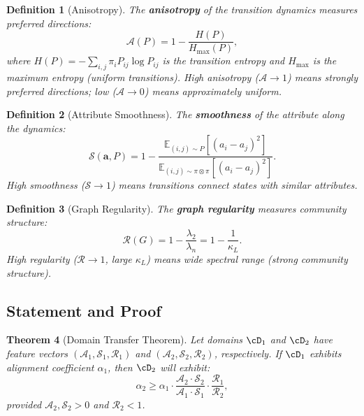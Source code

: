 \documentclass[12pt,letterpaper]{article}
\newtheorem{theorem}{Theorem}[section]
\newtheorem{definition}[theorem]{Definition}
\newcommand{\E}{\mathbb{E}}
\newcommand{\bfa}{\mathbf{a}}
\newcommand{\cA}{\mathcal{A}}
\newcommand{\cS}{\mathcal{S}}
\newcommand{\cR}{\mathcal{R}}
\begin{document}
\begin{definition}[Anisotropy]
\label{def:anisotropy}
The \textbf{anisotropy} of the transition dynamics measures preferred directions:
\[
  \cA(P) = 1 - \frac{H(P)}{H_{\max}(P)},
\]
where $H(P) = -\sum_{i,j} \pi_i P_{ij} \log P_{ij}$ is the transition entropy and $H_{\max}$ is the maximum entropy (uniform transitions). High anisotropy ($\cA \to 1$) means strongly preferred directions; low ($\cA \to 0$) means approximately uniform.
\end{definition}

\begin{definition}[Attribute Smoothness]
\label{def:smoothness}
The \textbf{smoothness} of the attribute along the dynamics:
\[
  \cS(\bfa, P) = 1 - \frac{\E_{(i,j) \sim P}[(a_i - a_j)^2]}{\E_{(i,j) \sim \pi \otimes \pi}[(a_i - a_j)^2]}.
\]
High smoothness ($\cS \to 1$) means transitions connect states with similar attributes.
\end{definition}

\begin{definition}[Graph Regularity]
\label{def:regularity}
The \textbf{graph regularity} measures community structure:
\[
  \cR(G) = 1 - \frac{\lambda_2}{\lambda_n} = 1 - \frac{1}{\kappa_L}.
\]
High regularity ($\cR \to 1$, large $\kappa_L$) means wide spectral range (strong community structure).
\end{definition}

\subsection{Statement and Proof}

\begin{theorem}[Domain Transfer Theorem]
\label{thm:transfer}
Let domains $\cD_1$ and $\cD_2$ have feature vectors $(\cA_1, \cS_1, \cR_1)$ and $(\cA_2, \cS_2, \cR_2)$, respectively. If $\cD_1$ exhibits alignment coefficient $\alpha_1$, then $\cD_2$ will exhibit:
\begin{equation}
\label{eq:transfer}
  \alpha_2 \geq \alpha_1 \cdot \frac{\cA_2 \cdot \cS_2}{\cA_1 \cdot \cS_1} \cdot \frac{\cR_1}{\cR_2},
\end{equation}
provided $\cA_2, \cS_2 > 0$ and $\cR_2 < 1$.
\end{theorem}
\end{document}

